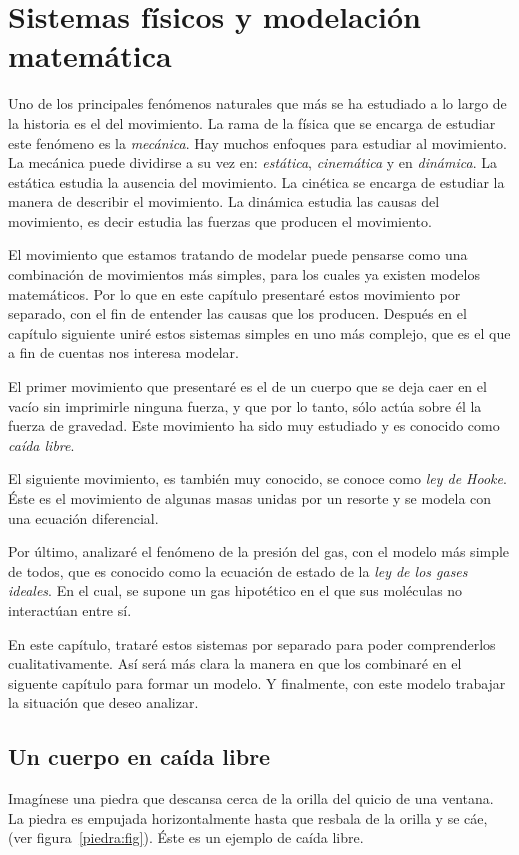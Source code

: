 \chapter{Sistemas físicos y modelación matemática}

Uno de los principales fenómenos naturales que más se ha estudiado a lo largo de la historia es el del movimiento. La rama de la física que se encarga de estudiar este fenómeno es la \emph{mecánica}. Hay muchos enfoques para estudiar al movimiento. La mecánica puede dividirse a su vez en: \emph{estática}, \emph{cinemática} y en \emph{dinámica}. La estática estudia la ausencia del movimiento. La cinética se encarga de estudiar la manera de describir el movimiento. La dinámica estudia las causas del movimiento, es decir estudia las fuerzas que producen el movimiento.

El movimiento que estamos tratando de modelar puede pensarse como una combinación de movimientos más simples, para los cuales ya existen modelos matemáticos. Por lo que en este capítulo presentaré estos movimiento por separado, con el fin de entender las causas que los producen. Después en el capítulo siguiente uniré estos sistemas simples en uno más complejo, que es el que a fin de cuentas nos interesa modelar.

El primer movimiento que presentaré es el de un cuerpo que se deja caer en el vacío sin imprimirle ninguna fuerza, y que por lo tanto, sólo actúa sobre él la fuerza de gravedad. Este movimiento ha sido muy estudiado y es conocido como \emph{caída libre}. 

El siguiente movimiento, es también muy conocido, se conoce como \emph{ley de Hooke}. Éste es el movimiento de algunas masas unidas por un resorte y se modela con una ecuación diferencial.

Por último, analizaré el fenómeno de la presión del gas, con el modelo más simple de todos, que es conocido como la ecuación de estado de la \emph{ley de los gases ideales}. En el cual, se supone un gas hipotético en el que sus moléculas no interactúan entre sí.

En este capítulo, trataré estos sistemas por separado para poder comprenderlos cualitativamente. Así será más clara la manera en que los combinaré en el siguente capítulo para formar un modelo. Y finalmente, con este modelo trabajar la situación que deseo analizar.

\section{Un cuerpo en caída libre}
Imagínese una piedra que descansa cerca de la orilla del quicio de una ventana. La piedra es empujada horizontalmente hasta que resbala de la orilla y se cáe, (ver figura~\ref{piedra:fig}). Éste es un ejemplo de caída libre.

